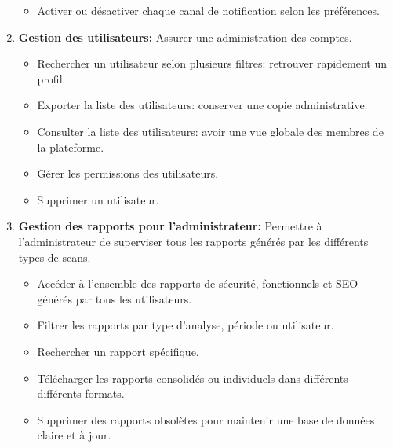 \begin{justify}
\begin{enumerate}[left=-0.01cm]
\begin{itemize}[label=$\bullet$, left=-0.05cm]
                \item Activer ou désactiver chaque canal de notification selon les préférences.
            \end{itemize}
        \item \textbf{Gestion des utilisateurs:} Assurer une administration des comptes.
            \begin{itemize}[label=$\bullet$, left=-0.05cm]
                \item Rechercher un utilisateur selon plusieurs filtres: retrouver rapidement un profil.
                \item Exporter la liste des utilisateurs: conserver une copie administrative.
                \item Consulter la liste des utilisateurs: avoir une vue globale des membres de la plateforme.
                \item Gérer les permissions des utilisateurs.
                \item Supprimer un utilisateur.
            \end{itemize}
        \item \textbf{Gestion des rapports pour l’administrateur:} Permettre à l’administrateur de superviser tous les rapports générés par les différents types de scans.
        \begin{itemize}[label=$\bullet$, left=-0.05cm]
            \item Accéder à l’ensemble des rapports de sécurité, fonctionnels et SEO générés par tous les utilisateurs.
            \item Filtrer les rapports par type d’analyse, période ou utilisateur.
            \item Rechercher un rapport spécifique.
            \item Télécharger les rapports consolidés ou individuels dans différents différents formats.
            \item Supprimer des rapports obsolètes pour maintenir une base de données claire et à jour.
        \end{itemize}
    \end{enumerate}
\end{justify}